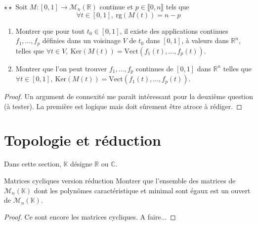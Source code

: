 \documentclass[french,a4paper]{article}
\newcommand{\R}{\mathbb{R}}
\newcommand{\C}{\mathbb{C}}
\newcommand{\K}{\mathbb{K}}
\renewcommand{\ker}{\text{Ker}}
\theoremstyle{plain}
\theoremstyle{definition}
\theoremstyle{remark}
\begin{document}
\begin{ex}{$\star\star$}
	Soit $M:[0,1]\to\mathcal{M}_n(\R)$ continue et $p\in\llbracket0,n\rrbracket$ tels que $$\forall t\in[0,1],\ \text{rg}(M(t))=n-p$$
	\begin{enumerate}
		\item Montrer que pour tout $t_0\in[0,1]$, il existe des applications continues $f_1,\ldots,f_p$ définies dans un voisinage $V$ de $t_0$ dans $[0,1]$, à valeurs dans $\R^n$, telles que $\forall t\in V,\ \ker(M(t))=\text{Vect}(f_1(t),\ldots,f_p(t))$.
		\item Montrer que l'on peut trouver $f_1,\ldots,f_p$ continues de $[0,1]$ dans $\R^n$ telles que $\forall t\in [0,1],\ \ker(M(t))=\text{Vect}(f_1(t),\ldots,f_p(t))$.
	\end{enumerate}
\end{ex}
\begin{proof}
	Un argument de connexité me paraît intéressant pour la deuxième question (à tester). La première est logique mais doit sûrement être atroce à rédiger.
\end{proof}

\section{Topologie et réduction}

Dans cette section, $\K$ désigne $\R$ ou $\C$.

\begin{ex}{Matrices cycliques version réduction}
	Montrer que l'ensemble des matrices de $\mathcal{M}_n(\K)$ dont les polynômes caractéristique et minimal sont égaux est un ouvert de $\mathcal{M}_n(\K)$.
\end{ex}
\begin{proof}
	Ce sont encore les matrices cycliques. A faire...
\end{proof}
\end{document}
